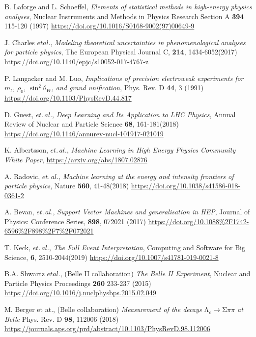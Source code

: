 \documentclass{article}
\begin{document}
\begin{thebibliography}{9}
B. Laforge and L. Schoeffel,
\textit{Elements of statistical methods in high-energy physics analyses},
Nuclear Instruments and Methods in Physics Research Section A \textbf{394} 115-120 (1997)
\url{https://doi.org/10.1016/S0168-9002(97)00649-9}

J. Charles $et al.$,
\textit{Modeling theoretical uncertainties in phenomenological analyses for particle physics},
The European Physical Journal C, \textbf{214}, 1434-6052(2017)
\url{https://doi.org/10.1140/epjc/s10052-017-4767-z}

P. Langacker and M. Luo,
\textit{Implications of precision electroweak experiments for $m_{t}$, $\rho_0$, $\sin^2\theta_W$, and grand unification},
Phys. Rev. D \textbf{44}, 3 (1991)
\url{https://doi.org/10.1103/PhysRevD.44.817}


D. Guest, $et.\,al.$,
\textit{Deep Learning and Its Application to LHC Physics},
Annual Review of Nuclear and Particle Science  \textbf{68}, 161-181(2018)
\url{https://doi.org/10.1146/annurev-nucl-101917-021019}

K. Albertsson, $et.\,al.$,
\textit{Machine Learning in High Energy Physics Community White Paper},
\url{https://arxiv.org/abs/1807.02876}


A. Radovic, $et.\,al.$,
\textit{Machine learning at the energy and intensity frontiers of particle physics},
Nature \textbf{560}, 41-48(2018)
\url{https://doi.org/10.1038/s41586-018-0361-2}

A. Bevan,  $et.\,al.$,
\textit{Support Vector Machines and generalisation in HEP},
Journal of Physics: Conference Series, \textbf{898}, 072021 (2017)
\url{https://doi.org/10.1088\%2F1742-6596\%2F898\%2F7\%2F072021}


T. Keck,  $et.\,al.$,
\textit{The Full Event Interpretation},
Computing and Software for Big Science, \textbf{6}, 2510-2044(2019)
\url{https://doi.org/10.1007/s41781-019-0021-8}


B.A. Shwartz $et al.$, (Belle II collaboration)
\textit{The Belle II Experiment},
Nuclear and Particle Physics Proceedings \textbf{260} 233-237 (2015)
\url{https://doi.org/10.1016/j.nuclphysbps.2015.02.049}


M. Berger et at., (Belle collaboration)
\textit{Measurement of the decays ${\mathrm{\ensuremath{\Lambda}}}_{c}\ensuremath{\rightarrow}\mathrm{\ensuremath{\Sigma}}\ensuremath{\pi}\ensuremath{\pi}$ at Belle}
Phys. Rev. D \textbf{98}, 112006 (2018)
\url{https://journals.aps.org/prd/abstract/10.1103/PhysRevD.98.112006}



\end{thebibliography}
\end{document}
